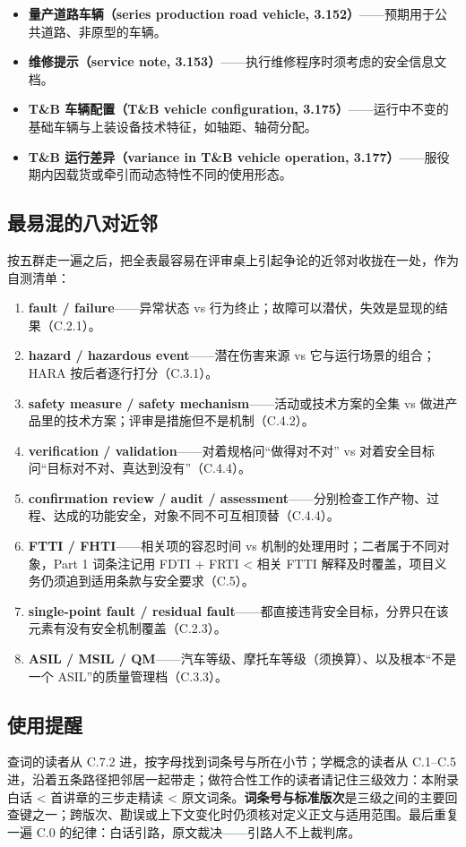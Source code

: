 \begin{itemize}
\item \textbf{量产道路车辆（series production road vehicle, 3.152）}——预期用于公共道路、非原型的车辆。
\item \textbf{维修提示（service note, 3.153）}——执行维修程序时须考虑的安全信息文档。
\item \textbf{T\&B 车辆配置（T\&B vehicle configuration, 3.175）}——运行中不变的基础车辆与上装设备技术特征，如轴距、轴荷分配。
\item \textbf{T\&B 运行差异（variance in T\&B vehicle operation, 3.177）}——服役期内因载货或牵引而动态特性不同的使用形态。
\end{itemize}

\subsection{最易混的八对近邻}

按五群走一遍之后，把全表最容易在评审桌上引起争论的近邻对收拢在一处，作为自测清单：

\begin{enumerate}
\item \textbf{fault / failure}——异常状态 vs 行为终止；故障可以潜伏，失效是显现的结果（C.2.1）。
\item \textbf{hazard / hazardous event}——潜在伤害来源 vs 它与运行场景的组合；HARA 按后者逐行打分（C.3.1）。
\item \textbf{safety measure / safety mechanism}——活动或技术方案的全集 vs 做进产品里的技术方案；评审是措施但不是机制（C.4.2）。
\item \textbf{verification / validation}——对着规格问“做得对不对” vs 对着安全目标问“目标对不对、真达到没有”（C.4.4）。
\item \textbf{confirmation review / audit / assessment}——分别检查工作产物、过程、达成的功能安全，对象不同不可互相顶替（C.4.4）。
\item \textbf{FTTI / FHTI}——相关项的容忍时间 vs 机制的处理用时；二者属于不同对象，Part 1 词条注记用 FDTI + FRTI < 相关 FTTI 解释及时覆盖，项目义务仍须追到适用条款与安全要求（C.5）。
\item \textbf{single-point fault / residual fault}——都直接违背安全目标，分界只在该元素有没有安全机制覆盖（C.2.3）。
\item \textbf{ASIL / MSIL / QM}——汽车等级、摩托车等级（须换算）、以及根本“不是一个 ASIL”的质量管理档（C.3.3）。
\end{enumerate}

\subsection{使用提醒}

查词的读者从 C.7.2 进，按字母找到词条号与所在小节；学概念的读者从 C.1–C.5 进，沿着五条路径把邻居一起带走；做符合性工作的读者请记住三级效力：本附录白话 < 首讲章的三步走精读 < 原文词条。\textbf{词条号与标准版次}是三级之间的主要回查键之一；跨版次、勘误或上下文变化时仍须核对定义正文与适用范围。最后重复一遍 C.0 的纪律：白话引路，原文裁决——引路人不上裁判席。
